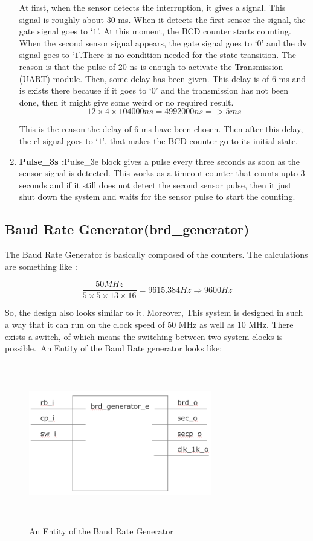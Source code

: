 \documentclass[12pt,a4paper]{article}
\begin{document}
\begin{enumerate}
At first, when the sensor detects the interruption, it gives a signal. This signal is roughly about 30 ms. When it detects the first sensor the signal, the gate signal goes to ‘$1$’. At this moment, the BCD counter starts counting. When the second sensor signal appears, the gate signal goes to ‘0’ and the dv signal goes to ‘$1$’.There is no condition needed for the state transition. The reason is that the pulse of 20 ns is enough to activate the Transmission (UART) module. Then, some delay has been given. This delay is of 6 ms and is exists there because if it goes to ‘$0$’ and the transmission has not been done, then it might give some weird or no required result. \
\[12\times 4\times 104000 ns= 4992000 ns => 5 ms \] 

This is the reason the delay of 6 ms have been chosen. Then after this delay, the cl signal goes to  ‘$1$’, that makes the BCD counter go to its initial state.\

\item \textbf{Pulse\_3s :}Pulse\_3e block gives a pulse every three seconds as soon as the sensor signal is detected. This works as a timeout counter that counts upto 3 seconds and if it still does not detect the second sensor pulse, then it just shut down the system and waits for the sensor pulse to start the counting.

\end{enumerate}

\subsection{Baud Rate Generator(brd\_generator)}
The Baud Rate Generator is basically composed of the counters. The calculations are something like :\

\[\frac{50 MHz}{5\times 5\times 13\times 16}= 9615.384Hz \Rightarrow 9600Hz \]

So, the design also looks similar to it. Moreover, This system is designed in such a way that it can run on the clock speed of 50 MHz as well as 10 MHz. There exists a switch, of which means the switching between two system clocks is possible.\
An Entity of the Baud Rate generator looks like:\\

\begin{figure}[H]
\centering
\includegraphics[width=8cm,height=7cm]{brdgeneratore.PNG}
\caption{ An Entity of the Baud Rate Generator}
\label{An Entity of the Baud Rate Generator}
\end{figure}
\end{document}
